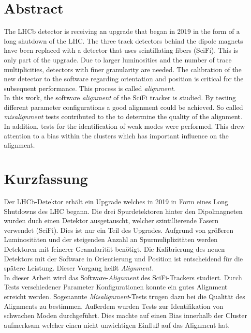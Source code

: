 \chapter*{Abstract}
\label{sec:abstract}

The LHCb detector is receiving an upgrade that began in 2019 in the form of a long
shutdown of the LHC. The three track detectors behind the dipole magnets have been
replaced with a detector that uses scintillating fibers (SciFi).
This is only part of the upgrade. Due to larger luminosities and the
number of trace multiplicities, detectors with finer granularity are needed.
The calibration of the new detector to the software regarding
orientation and position is critical for the subsequent performance. This
process is called \textit{alignment}.
\\
In this work, the software \textit{alignment} of the SciFi tracker is studied.
By testing different parameter configurations a good alignment could be achieved.
So called \textit{misalignment} tests contributed to the to determine the quality
of the alignment. In addition, tests for the identification of weak modes were performed.
This drew attention to a bias within the clusters which has important influence
on the alignment.

\chapter*{Kurzfassung}
\label{sec:kurzf}

Der LHCb-Detektor erhält ein Upgrade welches in 2019 in Form eines Long
Shutdowns des LHC begann. Die drei Spurdetektoren hinter den Dipolmagneten wurden
duch einen Detektor ausgetauscht, welcher szintillierende Fasern verwendet (SciFi).
Dies ist nur ein Teil des Upgrades. Aufgrund von größeren Luminositäten und der
steigenden Anzahl an Spurmuliplizitäten werden Detektoren mit feinerer
Granularität benötigt. Die Kalibrierung des neuen Detektors mit der Software in
Orientierung und Position ist entscheidend für die spätere Leistung. Dieser
Vorgang heißt \textit{Alignment}.
\\
In dieser Arbeit wird das Software-\textit{Alignment} des SciFi-Trackers studiert.
Durch Tests verschiedener Parameter Konfigurationen konnte ein gutes
Alignment erreicht werden. Sogenannte \textit{Misalignment}-Tests trugen dazu
bei die Qualität des Alignments zu bestimmen. Außerdem wurden Tests zur
Identifikation von schwachen Moden durchgeführt.
Dies machte auf einen Bias innerhalb der Cluster aufmerksam welcher einen
nicht-unwichtigen Einfluß auf das Alignment hat.
